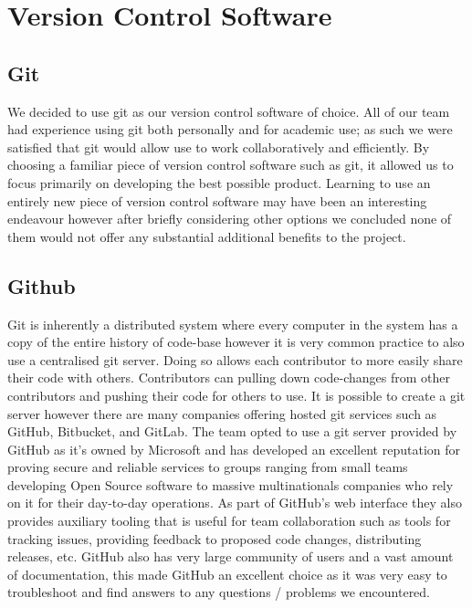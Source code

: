 \section{Version Control Software}

\subsection{Git}
We decided to use git as our version control software of choice. All of our team had experience using git both
personally and for academic use; as such we were satisfied that git would allow use to work collaboratively and
efficiently. By choosing a familiar piece of version control software such as git, it allowed us to focus primarily on
developing the best possible product. Learning to use an entirely new piece of version control software may have been an
interesting endeavour however after briefly considering other options we concluded none of them would not offer any
substantial additional benefits to the project.

\subsection{Github}
Git is inherently a distributed system where every computer in the system has a copy of the entire history of code-base however it is very common practice to also use a centralised git server. Doing so allows each contributor to more easily share their code with others. Contributors can pulling down code-changes from other contributors and pushing their code for others to use. It is possible to create a git server however there are many companies offering hosted git services such as GitHub, Bitbucket, and GitLab. The team opted to use a git server provided by GitHub as it's owned by Microsoft and has developed an excellent reputation for proving secure and reliable services to groups ranging from small teams developing Open Source software to massive multinationals companies who rely on it for their day-to-day operations. As part of GitHub's web interface they also provides auxiliary tooling that is useful for team collaboration such as tools for tracking issues, providing feedback to proposed code changes, distributing releases, etc. GitHub also has very large community of users and a vast amount of documentation, this made GitHub an excellent choice as it was very easy to troubleshoot and find answers to any questions / problems we encountered.

